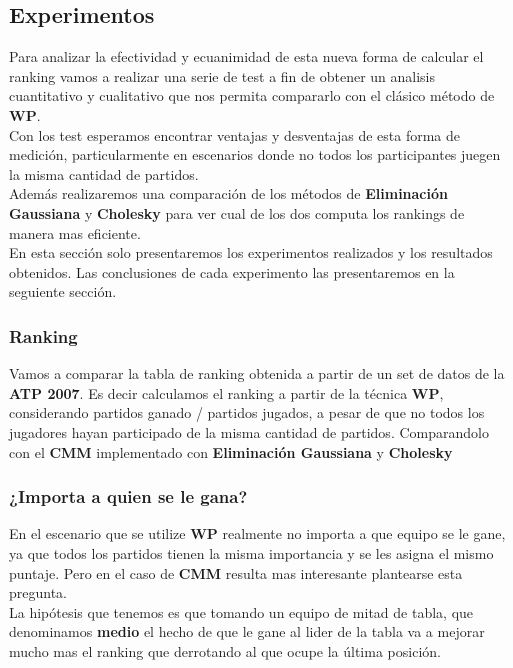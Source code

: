 \subsection{Experimentos}

Para analizar la efectividad y ecuanimidad de esta nueva forma de calcular el ranking vamos a realizar una serie de test a fin de obtener un analisis cuantitativo y cualitativo que nos permita compararlo con el clásico método de \textbf{WP}. \\
Con los test esperamos encontrar ventajas y desventajas de esta forma de medición, particularmente en escenarios donde no todos los participantes juegen la misma cantidad de partidos.
\\
Además realizaremos una comparación de los métodos de \textbf{Eliminación Gaussiana} y \textbf{Cholesky} para ver cual de los dos computa los rankings de manera mas eficiente.
\\
En esta sección solo presentaremos los experimentos realizados y los resultados obtenidos. Las conclusiones de cada experimento
las presentaremos en la seguiente sección. \\


\subsubsection{Ranking}

Vamos a comparar la tabla de ranking obtenida a partir de un set de datos de la \textbf{ATP 2007}. Es decir calculamos el ranking a partir de la técnica \textbf{WP}, considerando partidos ganado / partidos jugados, a pesar de que no todos los jugadores hayan participado de la misma cantidad de partidos. Comparandolo con el \textbf{CMM} implementado con \textbf{Eliminación Gaussiana} y \textbf{Cholesky}



\subsubsection{¿Importa a quien se le gana?}


En el escenario que se utilize \textbf{WP} realmente no importa a que equipo se le gane, ya que todos los partidos tienen la misma importancia y se les asigna el mismo puntaje. Pero en el caso de \textbf{CMM} resulta mas interesante plantearse esta pregunta. \\

La hipótesis que tenemos es que tomando un equipo de mitad de tabla, que denominamos \textbf{medio} el hecho de que le gane al lider de la tabla va a mejorar mucho mas el ranking que derrotando al que ocupe la última posición. \\

